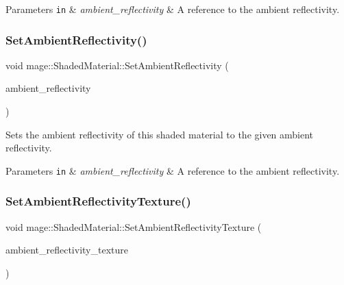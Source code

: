 \begin{DoxyParams}[1]{Parameters}
\mbox{\tt in}  & {\em ambient\+\_\+reflectivity} & A reference to the ambient reflectivity. \\
\hline
\end{DoxyParams}
\hypertarget{structmage_1_1_shaded_material_ab5752da022e7e7e91e92ec539148ea4d}{}\label{structmage_1_1_shaded_material_ab5752da022e7e7e91e92ec539148ea4d} 
\subsubsection{\texorpdfstring{Set\+Ambient\+Reflectivity()}{SetAmbientReflectivity()}\hspace{0.1cm}{\footnotesize\ttfamily [2/2]}}
{\footnotesize\ttfamily void mage\+::\+Shaded\+Material\+::\+Set\+Ambient\+Reflectivity (\begin{DoxyParamCaption}\item[{\hyperlink{structmage_1_1_r_g_b_spectrum}{R\+G\+B\+Spectrum} \&\&}]{ambient\+\_\+reflectivity }\end{DoxyParamCaption})\hspace{0.3cm}{\ttfamily [noexcept]}}

Sets the ambient reflectivity of this shaded material to the given ambient reflectivity.


\begin{DoxyParams}[1]{Parameters}
\mbox{\tt in}  & {\em ambient\+\_\+reflectivity} & A reference to the ambient reflectivity. \\
\hline
\end{DoxyParams}
\hypertarget{structmage_1_1_shaded_material_aacf12d6f3ed2b55c90366790345c6fd6}{}\label{structmage_1_1_shaded_material_aacf12d6f3ed2b55c90366790345c6fd6} 
\subsubsection{\texorpdfstring{Set\+Ambient\+Reflectivity\+Texture()}{SetAmbientReflectivityTexture()}}
{\footnotesize\ttfamily void mage\+::\+Shaded\+Material\+::\+Set\+Ambient\+Reflectivity\+Texture (\begin{DoxyParamCaption}\item[{\hyperlink{namespacemage_a1e01ae66713838a7a67d30e44c67703e}{Shared\+Ptr}$<$ \hyperlink{classmage_1_1_texture}{Texture} $>$}]{ambient\+\_\+reflectivity\+\_\+texture }\end{DoxyParamCaption})}

